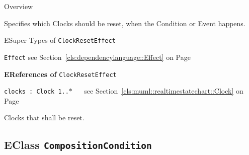 	\begin{longdescription}
		\item[Overview] 		
				

	

		Specifies which Clocks should be reset, when the Condition or Event happens.		
		\item[ESuper Types of \texttt{ClockResetEffect}] ~
			\begin{longdescription}
				\item[\texttt{Effect}] see Section~\ref{cls:dependencylanguage::Effect} on Page~\pageref{cls:dependencylanguage::Effect}						\end{longdescription}
		
	
			\item[\textbf{EReferences of} \texttt{ClockResetEffect}] ~
			\begin{longdescription}
	\item[\texttt{clocks : Clock \symbol{"5B}1..$*$\symbol{"5D}
}] ~
	see Section~\ref{cls:muml::realtimestatechart::Clock} on Page~\pageref{cls:muml::realtimestatechart::Clock}
	
	\nopagebreak
		
				

	

		Clocks that shall be reset.		
			\end{longdescription}
	
	\end{longdescription}
	

\subsection{EClass \bfseries \texttt{CompositionCondition}\normalfont}
\label{cls:dependencylanguage::CompositionCondition} 
	
